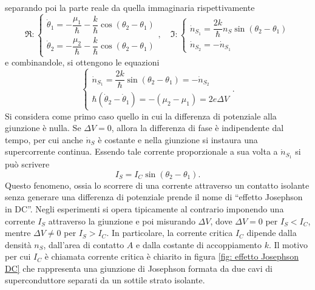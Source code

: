 separando poi la parte reale da quella immaginaria rispettivamente 
\begin{equation}
    \Re :
    \begin{cases}
        \dot{\theta}_1 = -\dfrac{\mu_1}{\hbar} - \dfrac{k}{\hbar}\cos{(\theta_2 - \theta_1)} \\[2ex]
        \dot{\theta}_2 = -\dfrac{\mu_2}{\hbar} - \dfrac{k}{\hbar}\cos{(\theta_2 - \theta_1)}
    \end{cases},\quad \Im :
    \begin{cases}
        \dot{n}_{S_1} = \dfrac{2k}{\hbar}n_S\sin{(\theta_2 - \theta_1)} \\[2ex]
        \dot{n}_{S_2} = -\dot{n}_{S_1}
    \end{cases}
\end{equation}
e combinandole, si ottengono le equazioni
\begin{equation}
\label{eq: equazioni effetto Josephson}
    \begin{cases}
        \dot{n}_{S_1} = \dfrac{2k}{\hbar}\sin{(\theta_2 - \theta_1)} = -\dot{n}_{S_2} \\[2ex]
        \hbar(\dot{\theta}_2 - \dot{\theta}_1) = -(\mu_2 - \mu_1) = 2e\Delta V
    \end{cases}.
\end{equation}
Si considera come primo caso quello in cui la differenza di potenziale alla giunzione è nulla. Se $\Delta V = 0$, allora la differenza di fase è indipendente dal tempo, per cui anche $\dot{n}_S$ è costante e nella giunzione si instaura una supercorrente continua. Essendo tale corrente proporzionale a sua volta a $\dot{n}_{S_1}$ si può scrivere
    \begin{equation}
        I_S = I_C\sin{(\theta_2 - \theta_1)}.
    \end{equation}
Questo fenomeno, ossia lo scorrere di una corrente attraverso un contatto isolante senza generare una differenza di potenziale prende il nome di ``effetto Josephson in DC''. Negli esperimenti si opera tipicamente al contrario imponendo una corrente $I_S$ attraverso la giunzione e poi misurando $\Delta V$, dove $\Delta V = 0$ per $I_S < I_C$, mentre $\Delta V \neq 0$ per $I_S > I_C$. In particolare, la corrente critica $I_C$ dipende dalla densità $n_S$, dall'area di contatto $A$ e dalla costante di accoppiamento $k$. Il motivo per cui $I_C$ è chiamata corrente critica è chiarito in figura \ref{fig: effetto Josephson DC} che rappresenta una giunzione di Josephson formata da due cavi di superconduttore separati da un sottile strato isolante.
